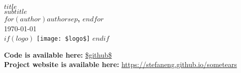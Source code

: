 \vspace{6em}
\begin{center}
    {\Large \textbf{$title$}} \\[1em]
    {\large \textit{$subtitle$}} \\[1em]
    \textbf{$for(author)$$author$$sep$, $endfor$} \\[1em]
    \today \\[1em]
    $if(logo)$
    \texttt{[image: \$logo\$]}
    $endif$
\end{center}
\textbf{Code is available here: } \url{$github$} \\[1em]
\textbf{Project website is available here: } \url{https://stefaneng.github.io/sometears} \\[1em]


\newpage
